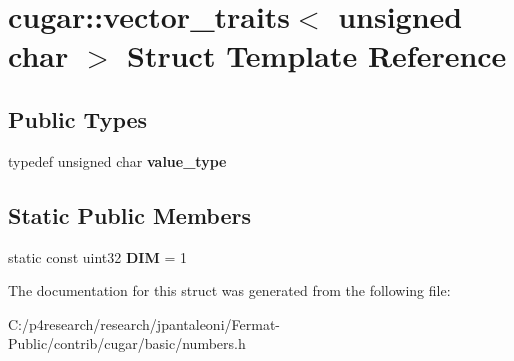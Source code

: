 \hypertarget{structcugar_1_1vector__traits_3_01unsigned_01char_01_4}{}\section{cugar\+:\+:vector\+\_\+traits$<$ unsigned char $>$ Struct Template Reference}
\label{structcugar_1_1vector__traits_3_01unsigned_01char_01_4}
\subsection*{Public Types}
\begin{DoxyCompactItemize}
\item 
\mbox{\label{structcugar_1_1vector__traits_3_01unsigned_01char_01_4_aa36d5b02aeb4112176212fd753ce2a71}} 
typedef unsigned char {\bfseries value\+\_\+type}
\end{DoxyCompactItemize}
\subsection*{Static Public Members}
\begin{DoxyCompactItemize}
\item 
\mbox{\label{structcugar_1_1vector__traits_3_01unsigned_01char_01_4_ac8b138ea8ca96cbb5925b7daf163233d}} 
static const uint32 {\bfseries D\+IM} = 1
\end{DoxyCompactItemize}


The documentation for this struct was generated from the following file\+:\begin{DoxyCompactItemize}
\item 
C\+:/p4research/research/jpantaleoni/\+Fermat-\/\+Public/contrib/cugar/basic/numbers.\+h\end{DoxyCompactItemize}

